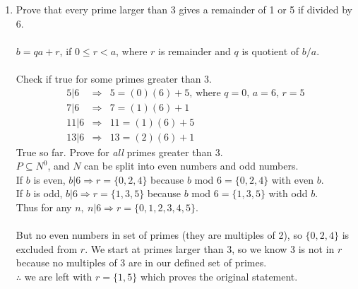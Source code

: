 \documentclass[10pt,a4paper,final]{article}
\begin{document}
\begin{enumerate}
\item %
Prove that every prime larger than 3 gives a remainder of 1 or 5 if divided by 6. \\
\\
$b = qa + r$, if $0 \leq r < a$, where $r$ is remainder and $q$ is quotient of $b/a$. \\
\\
Check if true for some primes greater than 3.\\
\begin{eqnarray*}
5 | 6 &\Rightarrow& 5 = (0)(6) + 5 \mbox{, where $q = 0$, $a = 6$, $r = 5$}\\
7 | 6 &\Rightarrow& 7 = (1)(6) + 1\\
11 | 6 &\Rightarrow& 11 = (1)(6) + 5\\
13 | 6 &\Rightarrow& 13 = (2)(6) + 1
\end{eqnarray*}
True so far. Prove for \emph{all} primes greater than 3.\\
$P \subseteq N^0$, and $N$ can be split into even numbers and odd numbers.\\
If $b$ is even, $b|6 \Rightarrow r = \{0,2,4\}$ because $b$ mod $6 = \{0,2,4\}$ with even $b$.\\
If $b$ is odd, $b|6 \Rightarrow r = \{1,3,5\}$ because $b$ mod $6 = \{1,3,5\}$ with odd $b$.\\
Thus for any $n,\: n|6 \Rightarrow r =\{0,1,2,3,4,5\}$.\\
\\
But no even numbers in set of primes (they are multiples of 2), so $\{0,2,4\}$ is excluded from $r$.
We start at primes larger than 3, so we know 3 is not in $r$ because no multiples of 3 are in 
our defined set of primes.\\
$\therefore$ we are left with $r = \{1,5\}$ which proves the original statement.


\end{enumerate}
\end{document}
